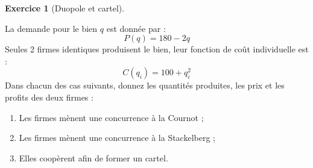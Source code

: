 \documentclass[
]{book}
\providecommand{\tightlist}{%
  \setlength{\itemsep}{0pt}\setlength{\parskip}{0pt}}
\theoremstyle{definition}
\theoremstyle{definition}
\theoremstyle{definition}
\newtheorem{exercise}{Exercice}[chapter]
\theoremstyle{definition}
\theoremstyle{remark}
\begin{document}
\begin{exercise}[Duopole et cartel]
\protect\hypertarget{exr:cartelexo2}{}\label{exr:cartelexo2}

La demande pour le bien \(q\) est donnée par :
\[P(q)=180-2q\]
Seules 2 firmes identiques produisent le bien, leur fonction de coût individuelle est :
\[C(q_{i})=100+q_{i}^2\]
Dans chacun des cas suivants, donnez les quantités produites, les prix et les profits des deux firmes :

\begin{enumerate}
\def\labelenumi{\arabic{enumi}.}
\tightlist
\item
  Les firmes mènent une concurrence à la Cournot ;
\item
  Les firmes mènent une concurrence à la Stackelberg ;
\item
  Elles coopèrent afin de former un cartel.
\end{enumerate}

\end{exercise}
\end{document}
